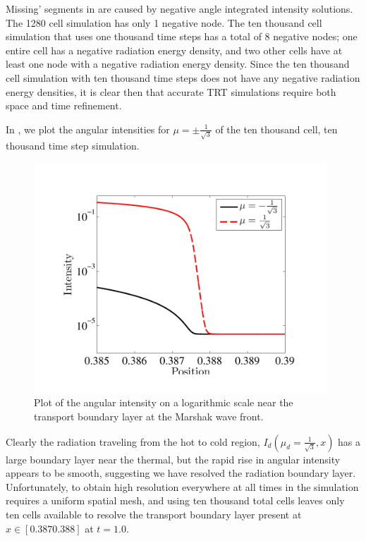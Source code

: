 Missing' segments in  are caused by negative angle integrated intensity solutions.
The 1280 cell simulation has only 1 negative node.
The ten thousand cell simulation that uses one thousand time steps has a total of 8 negative nodes; one entire cell has a negative radiation energy density, and two other cells have at least one node with a negative radiation energy density.
Since the ten thousand cell simulation with ten thousand time steps does not have any negative radiation energy densities, it is clear then that accurate TRT simulations require both space and time refinement.

In , we plot the angular intensities for $\mu=\pm\frac{1}{\sqrt{3}}$ of the ten thousand cell, ten thousand time step simulation.  
\begin{figure}[!htp]
\centering
\includegraphics[width=11cm,trim=0.5in  0.0in 0.5in 0.5in,clip=true]{chapter6_grey_radtran/Dissertation_Data/50_Cells_at_Wavefront_Intensity_Log.pdf}
\caption{Plot of the angular intensity on a logarithmic scale near the transport boundary layer at the Marshak wave front.}
\label{fig:boundary_layer}
\end{figure}
Clearly the radiation traveling from the hot to cold region, $I_d(\mu_d=\frac{1}{\sqrt{3}},x)$ has a large boundary layer near the thermal, but the rapid rise in angular intensity appears to be smooth, suggesting we have resolved the radiation boundary layer. 
Unfortunately, to obtain high resolution everywhere at all times in the simulation requires a uniform spatial mesh, and using ten thousand total cells leaves only ten cells available to resolve the transport boundary layer present at $x\in[0.387 0.388]$ at $t=1.0$.

